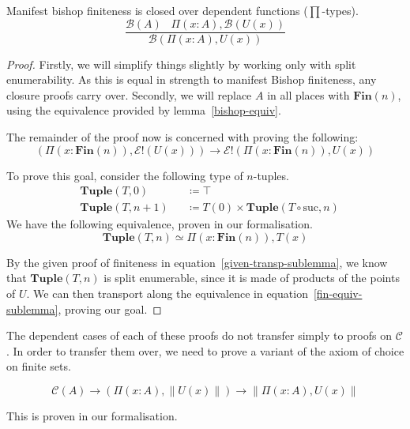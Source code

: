 \begin{romlemma}
  Manifest bishop finiteness is closed over dependent functions
  (\(\prod\)-types).
  \begin{equation}
    \frac{
      \mathcal{B}(A) \; \; \; \Pi {(x : A)} , \mathcal{B}\left( U(x) \right)
    }{
      \mathcal{B}\left(\Pi {(x : A)} , U(x)\right)
    }
  \end{equation}
\end{romlemma}
\begin{proof}
  Firstly, we will simplify things slightly by working only with split
  enumerability.
  As this is equal in strength to manifest Bishop finiteness, any closure proofs
  carry over.
  Secondly, we will replace \(A\) in all places with \(\mathbf{Fin}(n)\), using
  the equivalence provided by lemma~\ref{bishop-equiv}.

  The remainder of the proof now is concerned with proving the following:
  \begin{equation} \label{given-transp-sublemma}
    \left( \Pi {(x : \mathbf{Fin}(n))} , \mathcal{E}!(U(x)) \right) \rightarrow \mathcal{E}!\left( \Pi {(x : \mathbf{Fin}(n))} , U(x) \right)
  \end{equation}

  To prove this goal, consider the following type of \(n\)-tuples.
  \begin{equation}
    \begin{alignat}{3}
      & \mathbf{Tuple}(T, 0)   &&\coloneqq \top \\
      & \mathbf{Tuple}(T, n+1) &&\coloneqq T(0) \times \mathbf{Tuple}(T \circ \text{suc}, n)
    \end{alignat}
  \end{equation}
  We have the following equivalence, proven in our formalisation.
  \begin{equation} \label{fin-equiv-sublemma}
    \mathbf{Tuple}(T, n) \simeq \Pi {(x : \mathbf{Fin}(n))} , T(x)
  \end{equation}

  By the given proof of finiteness in equation~\ref{given-transp-sublemma}, we
  know that \(\mathbf{Tuple}(T , n)\) is split enumerable, since it is made of
  products of the points of \(U\).
  We can then transport along the equivalence in
  equation~\ref{fin-equiv-sublemma}, proving our goal.
\end{proof}

The dependent cases of each of these proofs do not transfer simply to proofs on
\(\mathcal{C}\).
In order to transfer them over, we need to prove a variant of the axiom of
choice on finite sets.
\begin{romlemma}
  \begin{equation}
    \mathcal{C}(A) \rightarrow (\Pi(x : A) , \lVert U(x) \rVert) \rightarrow \lVert \Pi(x : A) , U(x) \rVert
  \end{equation}
\end{romlemma}
This is proven in our formalisation.
